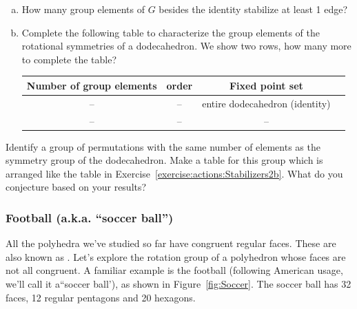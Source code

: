 \begin{exercise}\label{exercise:actions:Dodeca6} 
\begin{enumerate}[(a)]
\item How many group elements of $G$ besides the identity stabilize at least 1 edge?
\item
Complete the following table to characterize the group elements of the rotational symmetries of a dodecahedron.  We show two rows, how many more to complete the table?  

\begin{tabular}{| c |c|c| r |} \hline
 \textbf{ Number of group elements} & \textbf{order} & \textbf{Fixed point set} \\ \hline
  --&  --& entire  dodecahedron (identity) \\ \hline
  -- & --&  -- \\ 
\end{tabular}
\end{enumerate}
\end{exercise}
\begin{exercise}

Identify a group of permutations with the same number of elements as the symmetry group of the dodecahedron. Make a table for this group which is arranged like the table in Exercise~\ref{exercise:actions:Stabilizers2b}. What do you conjecture based on your results?
\end{exercise}

\subsubsection*{Football (a.k.a. ``soccer ball'')}
All the polyhedra we've studied so far have congruent regular faces.  These are also known as .  Let's explore the rotation group of a polyhedron whose faces are not all congruent.  A familiar example is the football (following 
American usage, we'll call it a``soccer ball'), as shown in  Figure~\ref{fig:Soccer}.  The soccer ball has 32 faces, 12 regular pentagons and 20 hexagons.  


